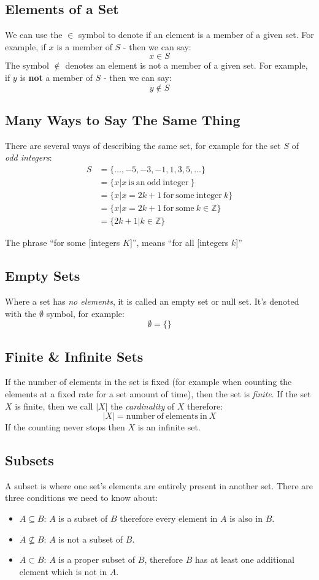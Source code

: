 \subsection{Elements of a Set}
We can use the $\in$ symbol to denote if an element is a member of a given set. For example, if $x$ is a member of $S$ - then we can say:
\[x \in S\]
The symbol $\notin$ denotes an element is not a member of a given set. For example, if $y$ is \textbf{not} a member of $S$ - then we can say:
\[y \notin S\]

\subsection{Many Ways to Say The Same Thing}
There are several ways of describing the same set, for example for the set $S$ of \textit{odd integers}:
\begin{align*}
    S &= \{\ldots, -5, -3, -1, 1, 3, 5, \ldots\}\\
    &= \{x | x \mathrm{\ is\ an\ odd\ integer\ } \}\\
    &= \{x | x=2k+1 \mathrm{\ for\ some\ integer\ } k \}\\
    &= \{x | x = 2k+ 1 \mathrm{\ for\ some\ } k \in \mathbb{Z}\}\\
    &= \{2k+1|k \in \mathbb{Z}\}
\end{align*}

The phrase ``for some [integers $K$]'', means ``for all [integers $k$]''

\subsection{Empty Sets}
Where a set has \textit{no elements}, it is called an empty set or null set. It's denoted with the $\emptyset$ symbol, for example:
\[\emptyset = \{ \}\]

\subsection{Finite \& Infinite Sets}
If the number of elements in the set is fixed (for example when counting the elements at a fixed rate for a set amount of time), then the set is \textit{finite}. If the set $X$ is finite, then we call $|X|$ the \textit{cardinality} of $X$ therefore:
\[|X| = \mathrm{number\ of\ elements\ in\ }X \]
If the counting never stops then $X$ is an infinite set.

\subsection{Subsets}
A subset is where one set's elements are entirely present in another set. There are three conditions we need to know about:
\begin{itemize}
    \item $A \subseteq B$: $A$ is a subset of $B$ therefore every element in $A$ is also in $B$.
    \item $A \nsubseteq B$: $A$ is not a subset of $B$.
    \item $A \subset B$: $A$ is a proper subset of $B$, therefore $B$ has at least one additional element which is not in $A$.
\end{itemize}

